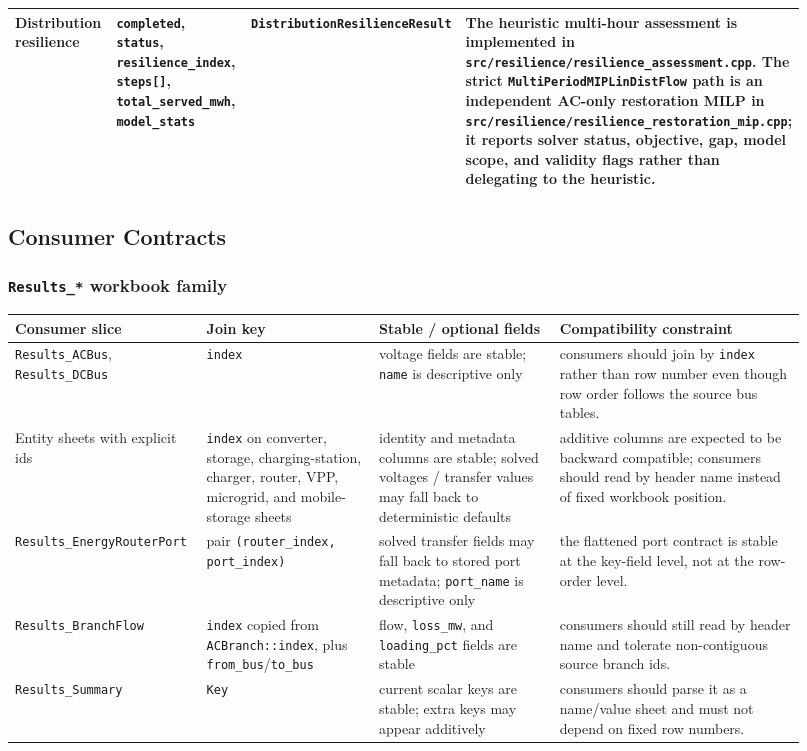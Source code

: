\begin{longtable}{@{}L{0.18\linewidth}L{0.24\linewidth}L{0.20\linewidth}L{0.30\linewidth}@{}}
Distribution resilience & \texttt{completed}, \texttt{status}, \texttt{resilience\_index}, \texttt{steps[]}, \texttt{total\_served\_mwh}, \texttt{model\_stats} & \texttt{DistributionResilienceResult} & The heuristic multi-hour assessment is implemented in \texttt{src/resilience/resilience\_assessment.cpp}.  The strict \texttt{MultiPeriodMIPLinDistFlow} path is an independent AC-only restoration MILP in \texttt{src/resilience/resilience\_restoration\_mip.cpp}; it reports solver status, objective, gap, model scope, and validity flags rather than delegating to the heuristic. \\
\bottomrule
\end{longtable}

\subsection{Consumer Contracts}

\subsubsection*{\texttt{Results\_*} workbook family}

\begin{longtable}{@{}L{0.19\linewidth}L{0.21\linewidth}L{0.22\linewidth}L{0.30\linewidth}@{}}
\toprule
Consumer slice & Join key & Stable / optional fields & Compatibility constraint \\
\midrule
\endhead
\texttt{Results\_ACBus}, \texttt{Results\_DCBus} & \texttt{index} & voltage fields are stable; \texttt{name} is descriptive only & consumers should join by \texttt{index} rather than row number even though row order follows the source bus tables. \\
Entity sheets with explicit ids & \texttt{index} on converter, storage, charging-station, charger, router, VPP, microgrid, and mobile-storage sheets & identity and metadata columns are stable; solved voltages / transfer values may fall back to deterministic defaults & additive columns are expected to be backward compatible; consumers should read by header name instead of fixed workbook position. \\
\texttt{Results\_EnergyRouterPort} & pair \texttt{(router\_index, port\_index)} & solved transfer fields may fall back to stored port metadata; \texttt{port\_name} is descriptive only & the flattened port contract is stable at the key-field level, not at the row-order level. \\
\texttt{Results\_BranchFlow} & \texttt{index} copied from \texttt{ACBranch::index}, plus \texttt{from\_bus}/\texttt{to\_bus} & flow, \texttt{loss\_mw}, and \texttt{loading\_pct} fields are stable & consumers should still read by header name and tolerate non-contiguous source branch ids. \\
\texttt{Results\_Summary} & \texttt{Key} & current scalar keys are stable; extra keys may appear additively & consumers should parse it as a name/value sheet and must not depend on fixed row numbers. \\
\bottomrule
\end{longtable}

